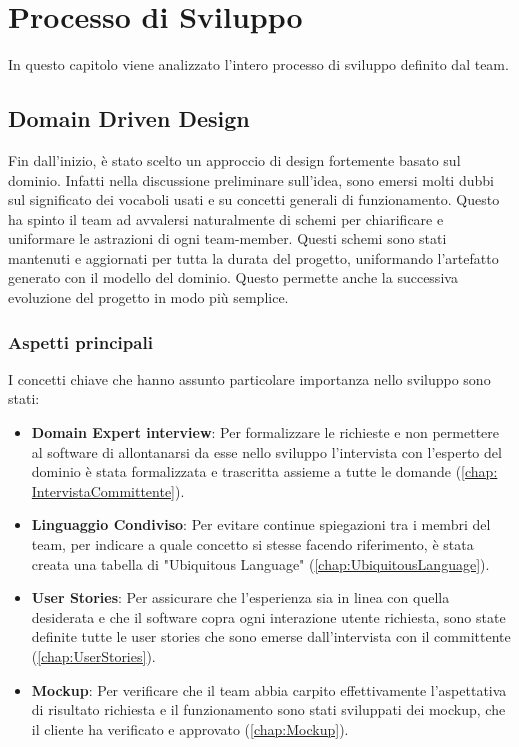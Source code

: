 \chapter{Processo di Sviluppo}
In questo capitolo viene analizzato l'intero processo di sviluppo definito dal team.

\section{Domain Driven Design}
 Fin dall'inizio, è stato scelto un approccio di design fortemente basato sul dominio. Infatti nella discussione preliminare sull'idea, sono emersi molti dubbi sul significato dei vocaboli usati e su concetti generali di funzionamento. Questo ha spinto il team ad avvalersi naturalmente di schemi per chiarificare e uniformare le astrazioni di ogni team-member. Questi schemi sono stati mantenuti e aggiornati per tutta la durata del progetto, uniformando l'artefatto generato con il modello del dominio. Questo permette anche la successiva evoluzione del progetto in modo più semplice.
    \subsection{Aspetti principali}
    I concetti chiave che hanno assunto particolare importanza nello sviluppo sono stati:
    \begin{itemize}
        \item \textbf{Domain Expert interview}: Per formalizzare le richieste e non permettere al software di allontanarsi da esse nello sviluppo l'intervista con l'esperto del dominio è stata formalizzata e trascritta assieme a tutte le domande (\ref{chap: IntervistaCommittente}).
        \item \textbf{Linguaggio Condiviso}: Per evitare continue spiegazioni tra i membri del team, per indicare a quale concetto si stesse facendo riferimento, è stata creata una tabella di "Ubiquitous Language" (\ref{chap:UbiquitousLanguage}).
        \item \textbf{User Stories}: Per assicurare che l'esperienza sia in linea con quella desiderata e che il software copra ogni interazione utente richiesta, sono state definite tutte le user stories che sono emerse dall'intervista con il committente (\ref{chap:UserStories}).
        \item \textbf{Mockup}: Per verificare che il team abbia carpito effettivamente l'aspettativa di risultato richiesta e il funzionamento sono stati sviluppati dei mockup, che il cliente ha verificato e approvato (\ref{chap:Mockup}).
    \end{itemize}


